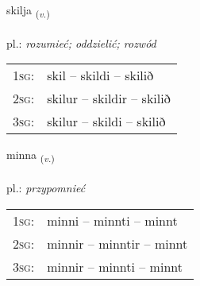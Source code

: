 \documentclass[frontgrid, backgrid]{flacards}\usepackage[]{graphicx}\usepackage[]{xcolor}
\begin{document}
\renewcommand{\flhead}{\vskip5pt \fboxsep=0pt {\small\bfseries\footnotesize Sagnorð | Verb}}
\renewcommand{\fcfoot}{\vskip5pt \fboxsep=0pt \hspace{2pt}{\small\bfseries\footnotesize 1K}}

\renewcommand{\blhead}{\vskip5pt {\small\bfseries\footnotesize Sagnorð | Verb }}
\renewcommand{\bcfoot}{\vskip5pt \hspace{2pt}{\small\bfseries\footnotesize 1K}}


{skilja \small{\textsubscript{(\textit{v.})}} \\[1ex] %
\textphonetic{[scɪlja]} \\
pl.: \emph{rozumieć; oddzielić; rozwód} \\  [2ex]
\renewcommand*{\arraystretch}{0.8}
\begin{tabular}{p{1cm}l}
\textsc{1sg}: & skil -- skildi -- skilið \\ 
\textsc{2sg}: & skilur -- skildir -- skilið \\ 
\textsc{3sg}: & skilur -- skildi -- skilið \\ 
\end{tabular}
}

\renewcommand{\flhead}{\vskip5pt \fboxsep=0pt {\small\bfseries\footnotesize Sagnorð | Verb}}
\renewcommand{\fcfoot}{\vskip5pt \fboxsep=0pt \hspace{2pt}{\small\bfseries\footnotesize 1K}}

\renewcommand{\blhead}{\vskip5pt {\small\bfseries\footnotesize Sagnorð | Verb }}
\renewcommand{\bcfoot}{\vskip5pt \hspace{2pt}{\small\bfseries\footnotesize 1K}}


{minna \small{\textsubscript{(\textit{v.})}} \\[1ex] %
\textphonetic{[mɪna]} \\
pl.: \emph{przypomnieć} \\  [2ex]
\renewcommand*{\arraystretch}{0.8}
\begin{tabular}{p{1cm}l}
\textsc{1sg}: & minni -- minnti -- minnt \\ 
\textsc{2sg}: & minnir -- minntir -- minnt \\ 
\textsc{3sg}: & minnir -- minnti -- minnt \\ 
\end{tabular}
}
\end{document}

